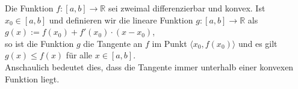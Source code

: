 \begin{Lemma}
  Die Funktion $f:[a,b] \rightarrow \mathbb{R}$ sei zweimal differenzierbar und konvex.
  Ist $x_0 \in [a,b]$ und definieren wir die lineare Funktion $g:[a,b] \rightarrow \mathbb{R}$ als
  \\[0.2cm]
  \hspace*{1.3cm}
  $g(x) := f(x_0) + f'(x_0) \cdot (x - x_0)$,
  \\[0.2cm]
  so ist die Funktion $g$ die Tangente an $f$ im Punkt $\langle x_0, f(x_0) \rangle$ und es gilt 
  \\[0.2cm]
  \hspace*{1.3cm}
  $g(x) \leq f(x)$ \quad f\"ur alle $x \in [a,b]$.
  \\[0.2cm]
  Anschaulich bedeutet dies, dass die Tangente immer unterhalb einer konvexen Funktion liegt.
\end{Lemma}

